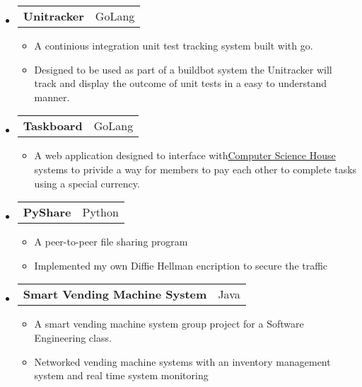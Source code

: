 \documentclass[letterpaper,11pt]{article}
\makeatletter
\newcommand{\restwosubheading}[2]{
\begin{tabular*}{6.5in}{l@{\extracolsep{\fill}}r}
		\textbf{#1} & #2 \\
\end{tabular*}\vspace{-6pt}}
\makeatother
\begin{document}
{\begin{itemize}
		\item 
		\restwosubheading{Unitracker }{GoLang}
			\begin{itemize}
				\item{A continious integration unit test tracking system built with go.}
                                \item{Designed to be used as part of a buildbot system the Unitracker will track and display the outcome of unit tests in a easy to understand manner.}
			\end{itemize}
		\item		
		\restwosubheading{Taskboard}{GoLang}
			\begin{itemize}
				\item{A web application designed to interface with{\href{http://csh.rit.edu}{Computer Science House} } systems to privide a way for members to pay each other to complete tasks using a special currency.} 
			\end{itemize}
		\item
		\restwosubheading{PyShare}{Python}
			\begin{itemize}
				\item{A peer-to-peer file sharing program}
                                \item{Implemented my own Diffie Hellman encription to secure the traffic}
			\end{itemize}
		\item		
		\restwosubheading{Smart Vending Machine System}{Java}
			\begin{itemize}
				\item{A smart vending machine system group project for a Software Engineering class.}
                                \item{Networked vending machine systems with an inventory management system and real time system monitoring}
			\end{itemize}
	\end{itemize}
}

\end{document}
